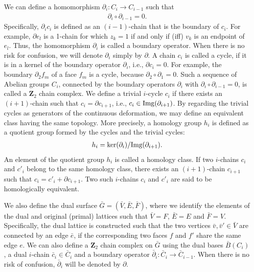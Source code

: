 We can define a homomorphism $\partial_i : C_i \rightarrow C_{i-1}$ such that 
\begin{eqnarray}
\partial _i \circ \partial _{i-1}=0.
\label{eq:boundary_op}
\end{eqnarray} 
Specifically, $\partial _i c_i $ is defined as an $(i-1)$-chain that is the boundary of $c_i$. 
For example, $\partial e_l$ is a 1-chain for which $z_k=1$ if and only if (iff) $v_k$ is an endpoint of $e_l$.
Thus, the homomorphism $\partial _i$ is called a boundary operator.
When there is no risk for confusion, we will denote $\partial _i$ simply by $\partial$.
A chain $c_i$ is called a cycle, if it is in a kernel of the boundary operator $\partial _i$, i.e., $\partial c_i=0$.
For example, the boundary $\partial_2 f_m$ of a face $f_m$ is a cycle, because $\partial _2 \circ \partial _1 =0$. 
Such a sequence of Abelian groups $C_i$, connected by the boundary operators $\partial _i$ with $\partial _i \circ \partial _{i-1}=0$, is called a $\mathbf{Z}_2$ chain complex.
We define a trivial $i$-cycle $c_i$ if there exists an $(i+1)$-chain such that $c_i = \partial c_{i+1}$, i.e., $c_i \in {\rm Img} (\partial _{i+1})$.
By regarding the trivial cycles as generators of the continuous deformation, we may define an equivalent class having the same topology.
More precisely, a homology group $h_i$ is defined as a quotient group formed by the cycles and the trivial cycles:
\begin{eqnarray}
h_i = \ker (\partial _i) / {\rm Img} (\partial _{i+1}).
\end{eqnarray}
An element of the quotient group $h_i$ is called a homology class.
If two $i$-chains $c_i$ and $c'_i$ belong to the same homology class, there exists an $(i+1)$-chain $c_{i+1}$ such that $c_i = c'_i + \partial c_{i+1}$.
Two such $i$-chains $c_i$ and $c'_i$ are said to be homologically equivalent.

We also define the dual surface $\bar G=(\bar V,\bar E,\bar F)$, where we identify the elements of the dual and original (primal) lattices such that $\bar V=F$, $\bar E=E$ and $\bar F=V$.
Specifically, the dual lattice is constructed such that the two vertices $\bar v, {\bar v}' \in \bar V$ are connected by an edge $\bar e$, if the corresponding two faces $f$ and $f'$ share the same edge $e$.
We can also define a $\mathbf{Z}_2$ chain complex on $\bar G$ using the dual bases $\bar B(C_i)$, a dual $i$-chain $\bar c_i \in \bar C_i$ and a boundary operator 
$\bar \partial _i: \bar C_i \rightarrow \bar C_{i-1}$.
When there is no risk of confusion, $\bar \partial _i$ will be denoted by $\partial$.
 
